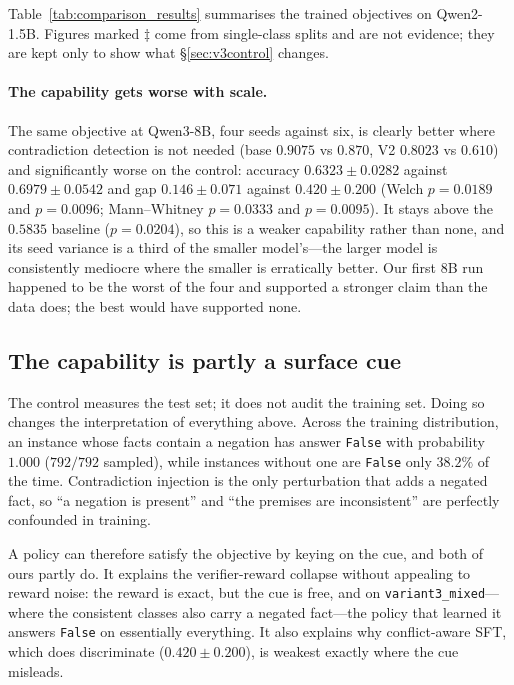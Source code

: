 \documentclass{article}
\begin{document}
Table~\ref{tab:comparison_results} summarises the trained objectives on
Qwen2-1.5B. Figures marked $\ddagger$ come from single-class splits and are not
evidence; they are kept only to show what \S\ref{sec:v3control} changes.

\paragraph{The capability gets worse with scale.} The same objective at
Qwen3-8B, four seeds against six, is clearly better where contradiction
detection is not needed (base $0.9075$ vs $0.870$, V2 $0.8023$ vs $0.610$) and
significantly worse on the control: accuracy $0.6323 \pm 0.0282$ against
$0.6979 \pm 0.0542$ and gap $0.146 \pm 0.071$ against $0.420 \pm 0.200$ (Welch
$p{=}0.0189$ and $p{=}0.0096$; Mann--Whitney $p{=}0.0333$ and $p{=}0.0095$). It
stays above the $0.5835$ baseline ($p{=}0.0204$), so this is a weaker capability
rather than none, and its seed variance is a third of the smaller model's---the
larger model is consistently mediocre where the smaller is erratically better.
Our first 8B run happened to be the worst of the four and supported a stronger
claim than the data does; the best would have supported none.

\subsection{The capability is partly a surface cue}
\label{sec:shortcut}

The control measures the test set; it does not audit the training set. Doing so
changes the interpretation of everything above. Across the training
distribution, an instance whose facts contain a negation has answer
\texttt{False} with probability $\mathbf{1.000}$ ($792/792$ sampled), while
instances without one are \texttt{False} only $38.2\%$ of the time. Contradiction
injection is the only perturbation that adds a negated fact, so ``a negation is
present'' and ``the premises are inconsistent'' are perfectly confounded in
training.

A policy can therefore satisfy the objective by keying on the cue, and both of
ours partly do. It explains the verifier-reward collapse without appealing to
reward noise: the reward is exact, but the cue is free, and on
\texttt{variant3\_mixed}---where the consistent classes also carry a negated
fact---the policy that learned it answers \texttt{False} on essentially
everything. It also explains why conflict-aware SFT, which does discriminate
($0.420 \pm 0.200$), is weakest exactly where the cue misleads.
\end{document}
